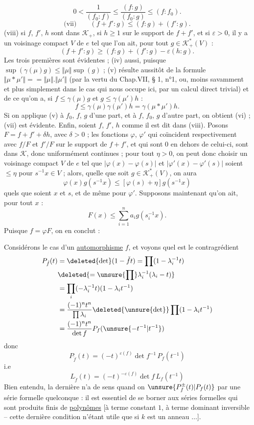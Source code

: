 \[
0<\frac{1}{(f_0:f)}\leq\frac{(f:g)}{(f_0:g)}\leq(f:f_0).
\]
\[
\text{(vii)}\qquad(f+f':g)\leq(f:g)+(f':g).
\]
(viii) si $f$, $f'$, $h$ sont dans $\mathcal{K}_+$, si $h\geq1$ sur le support de $f+f'$, et si $\varepsilon>0$, il y a un voisinage compact $V$ de $e$ tel que l'on ait, pour tout $g\in\mathcal{K}^*_+(V)$ :
\[
(f+f':g)\geq(f:g)+(f':g)-\varepsilon(h:g).
\]
Les trois premières sont évidentes ; (iv) aussi, puisque $\sup(\gamma(\mu)g)\leq\Vert\mu\Vert\sup(g)$ ; (v) résulte aussitôt de la formule $\Vert\mu*\mu'\Vert={} =\Vert\mu\Vert.\Vert\mu'\Vert$ (par la vertu du Chap.VII, § 1, n°1, ou, moins savamment et plus simplement dans le cas qui nous occupe ici, par un calcul direct trivial) et de ce qu'on a, si $f\leq\gamma(\mu)g$ et $g\leq\gamma(\mu')h$ :
\[
f\leq\gamma(\mu)\gamma(\mu')h=\gamma(\mu*\mu')h.
\]
Si on applique (v) à $f_0$, $f$, $g$ d'une part, et à $f$, $f_0$, $g$ d'autre part, on obtient (vi) ; (vii) est évidente. Enfin, soient $f$, $f'$, $h$ comme il est dit dans (viii). Posons $F=f+f'+\delta h$, avec $\delta>0$ ; les fonctions $\varphi$, $\varphi'$ qui coïncident respectivement avec $f/F$ et $f'/F$ sur le support de $f+f'$, et qui sont $0$ en dehors de celui-ci, sont dans $\mathcal{K}$, donc uniformément continues ; pour tout $\eta>0$, on peut donc choisir un voisinage compact $V$ de $e$ tel que $|\varphi(x)-\varphi(s)|$ et $|\varphi'(x)-\varphi'(s)|$ soient $\leq\eta$ pour $s^{-1}x\in V$ ; alors, quelle que soit $g\in\mathcal{K}^*_+(V)$, on aura
\[
\varphi(x)g(s^{-1}x)\leq[\varphi(s)+\eta]g(s^{-1}x)
\]
quels que soient $x$ et $s$, et de même pour $\varphi'$. Supposons maintenant qu'on ait, pour tout $x$ :
\[
F(x)\leq\sum_{i=1}^{n}a_i g(s_i^{-1}x).
\]
Puisque $f=\varphi F$, on en conclut :

Considérons le cas d'un \uline{automorphisme} $f$, et voyons quel est le   contragrédient
\[
\begin{aligned}
P_{\check f}(t)&=\deleted{\det}(1-\check f t)=\prod(1-\lambda_i^{-1}t)\\
&\deleted{=\unsure{\prod}\lambda_i^{-1}(\lambda_i-t)}\\
&=\prod_i(-\lambda_i^{-1}t)(1-\lambda_i t^{-1})\\
&=\frac{(-1)^n t^n}{\prod\lambda_i}\deleted{\unsure{\det}}\prod(1-\lambda_i t^{-1})\\
&=\frac{(-1)^n t^n}{\det f}P_f(\unsure{-t^{-1}|t^{-1}})
\end{aligned}
\]
donc
\deleted{
\[
P_{\check f}(t)=\deleted{\frac{\unsure{(-1)^n t^n}}{\det f}}\unsure{\varepsilon(f)}t^nP_f(t^{-1})\qquad\unsure{\varepsilon(f)}=
\]
}
\[
\boxed{P_{\check f}(t)=(-t)^{\varepsilon(f)}\det f^{-1}\,P_f(t^{-1})}
\]
i.e
\[
\boxed{L_{\check f}(t)=(-t)^{-\varepsilon(f)}\det f\,L_f(t^{-1})}
\]
Bien entendu, la dernière n'a  de sens quand on  $\unsure{P_f^{\pm}(t)|P_f(t)}$ par une série formelle quelconque : il est essentiel de se borner aux séries formelles qui sont produits  finis de \uline{polynômes} [à terme constant $1$, à terme dominant inversible -- cette dernière condition n'étant utile que si $k$ est un anneau  $\ldots$].

